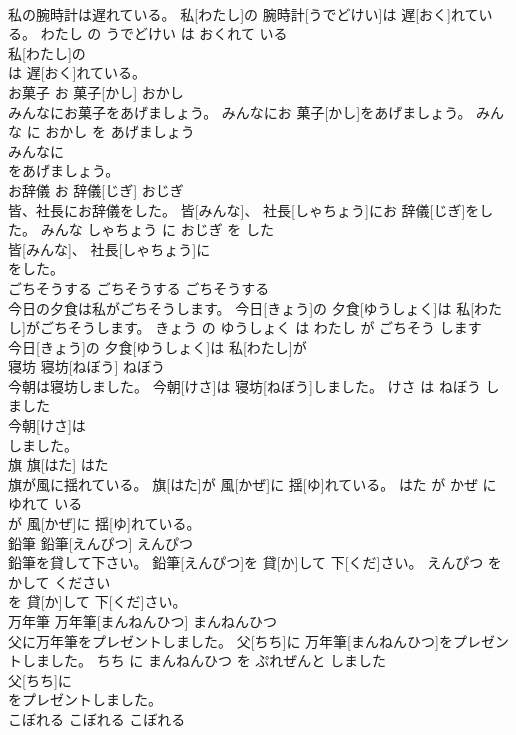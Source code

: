 \documentclass[8pt]{extreport}
\begin{document}
\begin{CJK}{UTF8}{min}
\\	私の腕時計は遅れている。	私[わたし]の 腕時計[うでどけい]は 遅[おく]れている。	わたし の うでどけい は おくれて いる	
\\	私[わたし]の
\\	は 遅[おく]れている。			
\\	お菓子	お 菓子[かし]	おかし	
\\	みんなにお菓子をあげましょう。	みんなにお 菓子[かし]をあげましょう。	みんな に おかし を あげましょう	
\\	みんなに
\\	をあげましょう。			
\\	お辞儀	お 辞儀[じぎ]	おじぎ	
\\	皆、社長にお辞儀をした。	皆[みんな]、 社長[しゃちょう]にお 辞儀[じぎ]をした。	みんな しゃちょう に おじぎ を した	
\\	皆[みんな]、 社長[しゃちょう]に
\\	をした。			
\\	ごちそうする	ごちそうする	ごちそうする	
\\	今日の夕食は私がごちそうします。	今日[きょう]の 夕食[ゆうしょく]は 私[わたし]がごちそうします。	きょう の ゆうしょく は わたし が ごちそう します	
\\	今日[きょう]の 夕食[ゆうしょく]は 私[わたし]が
\\	寝坊	寝坊[ねぼう]	ねぼう	
\\	今朝は寝坊しました。	今朝[けさ]は 寝坊[ねぼう]しました。	けさ は ねぼう しました	
\\	今朝[けさ]は
\\	しました。			
\\	旗	旗[はた]	はた	
\\	旗が風に揺れている。	旗[はた]が 風[かぜ]に 揺[ゆ]れている。	はた が かぜ に ゆれて いる	
\\	が 風[かぜ]に 揺[ゆ]れている。			
\\	鉛筆	鉛筆[えんぴつ]	えんぴつ	
\\	鉛筆を貸して下さい。	鉛筆[えんぴつ]を 貸[か]して 下[くだ]さい。	えんぴつ を かして ください	
\\	を 貸[か]して 下[くだ]さい。			
\\	万年筆	万年筆[まんねんひつ]	まんねんひつ	
\\	父に万年筆をプレゼントしました。	父[ちち]に 万年筆[まんねんひつ]をプレゼントしました。	ちち に まんねんひつ を ぷれぜんと しました	
\\	父[ちち]に
\\	をプレゼントしました。			
\\	こぼれる	こぼれる	こぼれる	

\end{CJK}
\end{document}

